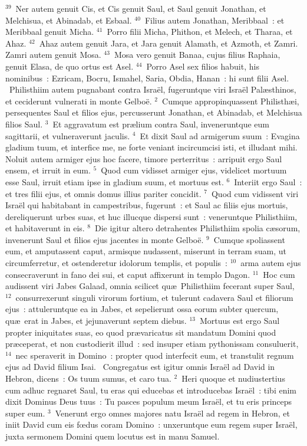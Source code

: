 ${}^{39}$~Ner autem genuit Cis, et Cis genuit Saul, et Saul genuit Jonathan, et Melchisua, et Abinadab, et Esbaal.
${}^{40}$~Filius autem Jonathan, Meribbaal~: et Meribbaal genuit Micha.
${}^{41}$~Porro filii Micha, Phithon, et Melech, et Tharaa, et Ahaz.
${}^{42}$~Ahaz autem genuit Jara, et Jara genuit Alamath, et Azmoth, et Zamri. Zamri autem genuit Mosa.
${}^{43}$~Mosa vero genuit Banaa, cujus filius Raphaia, genuit Elasa, de quo ortus est Asel.
${}^{44}$~Porro Asel sex filios habuit, his nominibus~: Ezricam, Bocru, Ismahel, Saria, Obdia, Hanan~: hi sunt filii Asel.
~Philisthiim autem pugnabant contra Isra\"el, fugeruntque viri Isra\"el Pal\ae sthinos, et ceciderunt vulnerati in monte Gelbo\"e.
${}^{2}$~Cumque appropinquassent Philisth\ae i, persequentes Saul et filios ejus, percusserunt Jonathan, et Abinadab, et Melchisua filios Saul.
${}^{3}$~Et aggravatum est pr\ae lium contra Saul, inveneruntque eum sagittarii, et vulneraverunt jaculis.
${}^{4}$~Et dixit Saul ad armigerum suum~: Evagina gladium tuum, et interfice me, ne forte veniant incircumcisi isti, et illudant mihi. Noluit autem armiger ejus hoc facere, timore perterritus~: arripuit ergo Saul ensem, et irruit in eum.
${}^{5}$~Quod cum vidisset armiger ejus, videlicet mortuum esse Saul, irruit etiam ipse in gladium suum, et mortuus est.
${}^{6}$~Interiit ergo Saul~: et tres filii ejus, et omnis domus illius pariter concidit.
${}^{7}$~Quod cum vidissent viri Isra\"el qui habitabant in campestribus, fugerunt~: et Saul ac filiis ejus mortuis, dereliquerunt urbes suas, et huc illucque dispersi sunt~: veneruntque Philisthiim, et habitaverunt in eis.
${}^{8}$~Die igitur altero detrahentes Philisthiim spolia c\ae sorum, invenerunt Saul et filios ejus jacentes in monte Gelbo\"e.
${}^{9}$~Cumque spoliassent eum, et amputassent caput, armisque nudassent, miserunt in terram suam, ut circumferretur, et ostenderetur idolorum templis, et populis~:
${}^{10}$~arma autem ejus consecraverunt in fano dei sui, et caput affixerunt in templo Dagon.
${}^{11}$~Hoc cum audissent viri Jabes Galaad, omnia scilicet qu\ae\ Philisthiim fecerant super Saul,
${}^{12}$~consurrexerunt singuli virorum fortium, et tulerunt cadavera Saul et filiorum ejus~: attuleruntque ea in Jabes, et sepelierunt ossa eorum subter quercum, qu\ae\ erat in Jabes, et jejunaverunt septem diebus.
${}^{13}$~Mortuus est ergo Saul propter iniquitates suas, eo quod pr\ae varicatus sit mandatum Domini quod pr\ae ceperat, et non custodierit illud~: sed insuper etiam pythonissam consuluerit,
${}^{14}$~nec speraverit in Domino~: propter quod interfecit eum, et transtulit regnum ejus ad David filium Isai.
~Congregatus est igitur omnis Isra\"el ad David in Hebron, dicens~: Os tuum sumus, et caro tua.
${}^{2}$~Heri quoque et nudiustertius cum adhuc regnaret Saul, tu eras qui educebas et introducebas Isra\"el~: tibi enim dixit Dominus Deus tuus~: Tu pasces populum meum Isra\"el, et tu eris princeps super eum.
${}^{3}$~Venerunt ergo omnes majores natu Isra\"el ad regem in Hebron, et iniit David cum eis fœdus coram Domino~: unxeruntque eum regem super Isra\"el, juxta sermonem Domini quem locutus est in manu Samuel.



